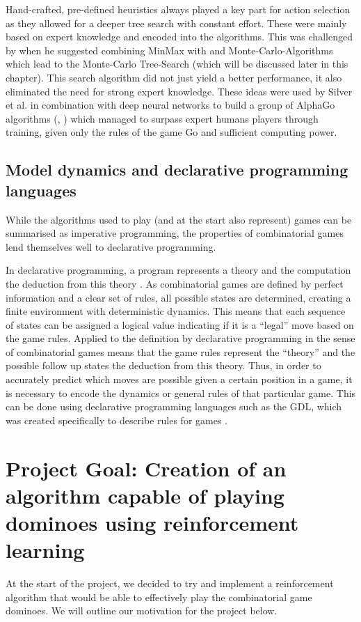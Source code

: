 \documentclass[12pt,a4paper]{article}
\begin{document}
Hand-crafted, pre-defined heuristics always played a key part for action selection as they allowed for a deeper tree search with constant effort. These were mainly based on expert knowledge and encoded into the algorithms. This was challenged by \citet{hutchison_efficient_2007} when he suggested combining MinMax with and Monte-Carlo-Algorithms which lead to the Monte-Carlo Tree-Search (which will be discussed later in this chapter). This search algorithm did not just yield a better performance, it also eliminated the need for strong expert knowledge. These ideas were used by Silver et al. in combination with deep neural networks to build a group of AlphaGo algorithms (\citeyear{silver_mastering_2016}, \citeyear{silver_mastering_2017}) which managed to surpass expert humans players through training, given only the rules of the game Go and sufficient computing power.

\subsection{Model dynamics and declarative programming languages}
While the algorithms used to play (and at the start also represent) games can be summarised as imperative programming, the properties of combinatorial games lend themselves well to declarative programming.

In declarative programming, a program represents a theory and the computation the deduction from this theory \citep{lloyd_practical_1994}. As combinatorial games are defined by perfect information and a clear set of rules, all possible states are determined, creating a finite environment with deterministic dynamics. This means that each sequence of states can be assigned a logical value indicating if it is a “legal” move based on the game rules. Applied to the definition by  \citet{lloyd_practical_1994} declarative programming in the sense of combinatorial games means that the game rules represent the  “theory” and the possible follow up states the deduction from this theory. Thus, in order to accurately predict which moves are possible given a certain position in a game, it is necessary to encode the dynamics or general rules of that particular game. This can be done using declarative programming languages such as the GDL, which was created specifically to describe rules for games \citep{love_general_2008}.


\section{Project Goal: Creation of an algorithm capable of playing dominoes using reinforcement learning}
At the start of the project, we decided to try and implement a reinforcement algorithm that would be able to effectively play the combinatorial game dominoes. We will outline our motivation for the project below.
\end{document}
